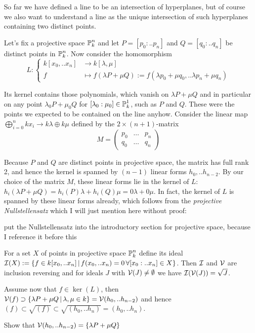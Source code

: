 
So far we have defined a line to be an intersection of hyperplanes, but of course we also want to understand a line as the unique intersection of such hyperplanes containing two distinct points.

Let's fix a projective space $\operatorname{\mathbb P}^n_k$ and let $P=[p_0:..p_n]$ and $Q=[q_0:..q_n]$ be distinct points in $\operatorname{\mathbb P}^n_k$. Now consider the homomorphism
\begin{equation}
L : \begin{cases}
k[x_0,..x_n] &\to k[\lambda,\mu] \\
f &\mapsto f(\lambda P + \mu Q) := f(\lambda p_0 + \mu q_0, .. \lambda p_n + \mu q_n)
\end{cases}
\end{equation}

Its kernel contains those polynomials, which vanish on $\lambda P + \mu Q$ and in particular on any point $\lambda_0 P + \mu_0 Q$ for $[\lambda_0:\mu_0] \in \operatorname{\mathbb P}^1_k$, such as $P$ and $Q$.
These were the points we expected to be contained on the line anyhow.
Consider the linear map $\bigoplus_{i=0}^n kx_i \to k\lambda \oplus k\mu$ defined by the $2\times (n+1)$-matrix
\begin{equation}
M=
\begin{pmatrix}
p_0 & \ldots & p_n \\
q_0 & \ldots & q_n
\end{pmatrix}
\end{equation}

Because $P$ and $Q$ are distinct points in projective space, the matrix has full rank 2, and hence the kernel is spanned by $(n-1)$ linear forms $h_0,..h_{n-2}$.
By our choice of the matrix $M$, these linear forms lie in the kernel of $L$: $h_i(\lambda P + \mu Q) = h_i(P) \lambda + h_i(Q)\mu = 0 \lambda + 0 \mu$.
In fact, the kernel of $L$ is spanned by these linear forms already, which follows from the \emph{projective Nullstellensatz} which I will just mention here without proof:

\begin{todo}
\item put the Nullstellensatz into the introductory section for projective space, because I reference it before this
\end{todo}

\begin{theorem}
For a set $X$ of points in projective space $\operatorname{\mathbb P}^n_k$ define its ideal $\operatorname{\mathcal I}(X) := \left\lbrace f \in k[x_0,..x_n]\,|\, f(x_0,..x_n) = 0\,\forall [x_0:..x_n] \in X\right\rbrace$.
Then $\operatorname{\mathcal I}$ and $\operatorname{\mathcal V}$ are inclusion reversing and for ideals $J$ with $\operatorname{\mathcal V}(J) \neq \emptyset$ we have $\operatorname{\mathcal I}(\operatorname{\mathcal V}(J)) = \sqrt{J}$.
\end{theorem}

Assume now that $f \in \ker(L)$, then $\operatorname{\mathcal V}(f) \supset \left\lbrace\lambda P + \mu Q\,|\, \lambda, \mu \in k\right\rbrace = \operatorname{\mathcal V}(h_0,..h_{n-2})$ and hence $(f) \subset \sqrt{(f)} \subset \sqrt{(h_0,..h_n)} = (h_0,..h_n)$.

\begin{todo}
\item Show that $\operatorname{\mathcal V}(h_0,..h_{n-2}) = \{ \lambda P + \mu Q \}$
\end{todo}

